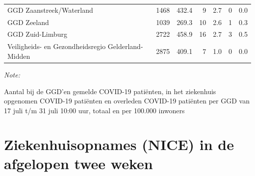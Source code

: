 \documentclass[
  english,
  man,floatsintext]{apa6}
\begin{document}
\begin{table}
\begin{threeparttable}
\begin{tabular}{lrrrrrr}
GGD Zaanstreek/Waterland & 1468 & 432.4 & 9 & 2.7 & 0 & 0.0\\
GGD Zeeland & 1039 & 269.3 & 10 & 2.6 & 1 & 0.3\\
GGD Zuid-Limburg & 2722 & 458.9 & 16 & 2.7 & 3 & 0.5\\
Veiligheids- en Gezondheidsregio Gelderland-Midden & 2875 & 409.1 & 7 & 1.0 & 0 & 0.0\\
\bottomrule
\end{tabular}
\begin{tablenotes}
\item \textit{Note: } 
\item Aantal bij de GGD’en gemelde COVID-19 patiënten, in het ziekenhuis opgenomen COVID-19 patiënten en overleden COVID-19 patiënten per GGD van 17 juli t/m 31 juli 10:00 uur, totaal en per 100.000 inwoners
\end{tablenotes}
\end{threeparttable}
\endgroup{}
\end{table}

\newpage

\hypertarget{ziekenhuisopnames-nice-in-de-afgelopen-twee-weken}{%
\section{Ziekenhuisopnames (NICE) in de afgelopen twee weken}\label{ziekenhuisopnames-nice-in-de-afgelopen-twee-weken}}
\end{document}
